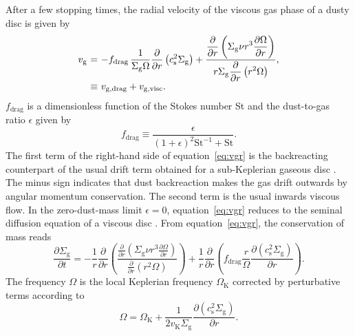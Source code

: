 \documentclass[a4paper,fleqn,usenatbib]{mnras}
\newcommand{\St}{\mathrm{St}}         %
\begin{document}
After a few stopping times, the radial velocity of the viscous gas phase of a dusty disc is given by
%
\begin{equation}
\begin{array}{r@{\ }c@{\ }l}
v_\mathrm{g} 
& = & -f_\mathrm{drag} \, \displaystyle\frac{1}{\Sigma_\mathrm{g} \Omega} \frac{\partial}{\partial r}\left(c_\mathrm{s}^2 \Sigma_\mathrm{g} \right) + \frac{\displaystyle\frac{\partial}{\partial r}\left( \Sigma_\mathrm{g} \nu r^3 \frac{\partial \Omega}{\partial r} \right)}{r \Sigma_\mathrm{g} \displaystyle \frac{\partial}{\partial r} \left( r^2 \Omega \right)}, \\
& \equiv & v_\mathrm{g,drag} + v_\mathrm{g,visc} .
\label{eq:vgr}
\end{array}
\end{equation}
%
$f_\mathrm{drag}$ is a dimensionless function of the Stokes number St and the dust-to-gas ratio $\epsilon$ given by
%
\begin{equation}
f_\mathrm{drag} \equiv \frac{\epsilon}{(1 + \epsilon)^2 \St^{-1} + \St} . \label{eq:fdrag}
\end{equation}
%
 The first term of the right-hand side of equation~\ref{eq:vgr} is the backreacting counterpart of the usual drift term obtained for a sub-Keplerian gaseous disc \citep{Nakagawa1986}. The minus sign indicates that dust backreaction makes the gas drift outwards by angular momentum conservation. The second term is the usual inwards viscous flow. In the zero-dust-mass limit $\epsilon = 0$, equation~\ref{eq:vgr} reduces to the seminal diffusion equation of a viscous disc \citep{LBP1974}. From equation~\ref{eq:vgr}, the conservation of mass reads
%
\begin{equation}
\frac{\partial \Sigma_\mathrm{g}}{\partial t} =  - \frac{1}{r} \frac{\partial }{\partial r}\left( \frac{\displaystyle\frac{\partial}{\partial r}\left( \Sigma_\mathrm{g} \nu r^3 \frac{\partial \Omega}{\partial r} \right)}{\displaystyle \frac{\partial}{\partial r} \left( r^2 \Omega \right)} \right) + \frac{1}{r} \frac{\partial}{\partial r} \left( f_\mathrm{drag}  \frac{r}{\Omega} \frac{\partial \left(c_\mathrm{s}^{2} \Sigma_\mathrm{g} \right)}{\partial r} \right). 
\label{eq:full_gas}
\end{equation}
%
The frequency $\Omega$ is the local Keplerian frequency $\Omega_\mathrm{K}$ corrected by perturbative terms according to
%
\begin{equation}
\Omega = \Omega_\mathrm{K} + \frac{1}{2 v_\mathrm{K} \Sigma_\mathrm{g}}\frac{\partial \left(c_\mathrm{s}^{2} \Sigma_\mathrm{g} \right)}{\partial r} .
\label{eq:def_omega}
\end{equation}
\end{document}
